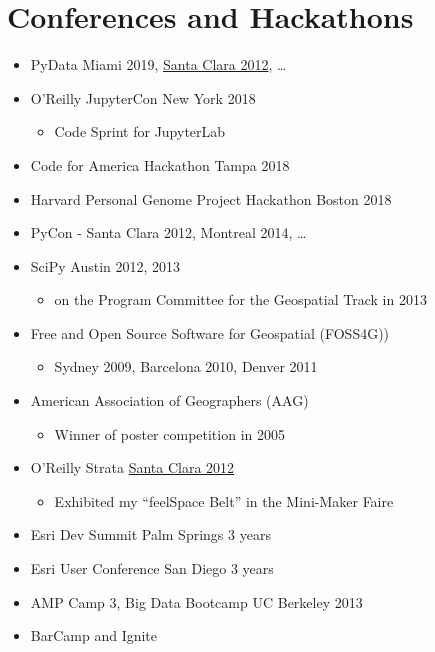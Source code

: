 \documentclass{article}
\newenvironment{mitemize}
               {%
                 \setlength{\parskip}{3pt}
                 \setlength{\itemsep}{2.5pt plus 1pt}
                 \begin{itemize}}
               {\end{itemize}}
\begin{document}
\section*{Conferences and Hackathons}
\begin{mitemize}
\item PyData Miami 2019, \href{https://conferences.oreilly.com/strata/strata2012/public/schedule/detail/23166}{Santa Clara 2012}, \ldots
\item O'Reilly JupyterCon New York 2018
  \begin{mitemize}
  \item Code Sprint for JupyterLab
  \end{mitemize}
  \item Code for America Hackathon Tampa 2018
  \item Harvard Personal Genome Project Hackathon Boston 2018
  \item PyCon - Santa Clara 2012, Montreal 2014, \ldots
  \item SciPy Austin 2012, 2013
    \begin{mitemize}
    \item on the Program Committee for the Geospatial Track in 2013
    \end{mitemize}
  \item Free and Open Source Software for Geospatial (FOSS4G))
    \begin{mitemize}
    \item Sydney 2009, Barcelona 2010, Denver 2011
    \end{mitemize}
  \item American Association of Geographers (AAG)
    \begin{mitemize}
    \item Winner of poster competition in 2005
    \end{mitemize}
  \item O'Reilly Strata \href{https://conferences.oreilly.com/strata/strata2012}{Santa Clara 2012}
    \begin{mitemize}
    \item Exhibited my ``feelSpace Belt'' in the Mini-Maker Faire
    \end{mitemize}
  \item Esri Dev Summit Palm Springs 3 years
  \item Esri User Conference San Diego 3 years
  \item AMP Camp 3, Big Data Bootcamp UC Berkeley 2013
  \item BarCamp and Ignite
    \begin{mitemize}

\end{mitemize}
\end{mitemize}
\end{document}

